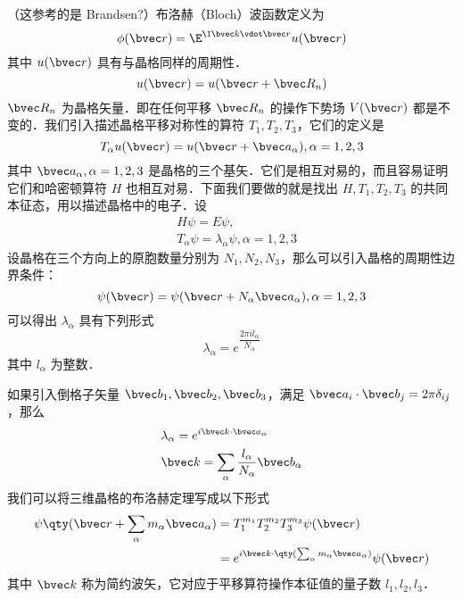 （这参考的是 Brandsen?）布洛赫（Bloch）波函数定义为
\begin{equation}
\phi(\bvec r) = \E^{\I \bvec k \vdot \bvec r} u(\bvec r)
\end{equation}
其中 $u(\bvec r)$ 具有与晶格同样的周期性．
\begin{equation}
u(\bvec r)=u(\bvec r+\bvec R_n)
\end{equation}
$\bvec R_n$ 为晶格矢量．即在任何平移 $\bvec R_n$ 的操作下势场 $V(\bvec r)$ 都是不变的．我们引入描述晶格平移对称性的算符 $T_1,T_2,T_3$，它们的定义是
\begin{equation}
T_\alpha u(\bvec r)= u(\bvec r+\bvec a_\alpha),\alpha=1,2,3
\end{equation}
其中 $\bvec a_\alpha,\alpha=1,2,3$ 是晶格的三个基矢．它们是相互对易的，而且容易证明它们和哈密顿算符 $H$ 也相互对易．下面我们要做的就是找出 $H,T_1,T_2,T_3$ 的共同本征态，用以描述晶格中的电子．设
\begin{equation}
\begin{aligned}
&H\psi=E\psi,\\
&T_\alpha \psi = \lambda_\alpha \psi, \alpha=1,2,3
\end{aligned}
\end{equation}
设晶格在三个方向上的原胞数量分别为 $N_1,N_2,N_3$，那么可以引入晶格的周期性边界条件：
\begin{equation}
\psi(\bvec r)=\psi(\bvec r+N_\alpha \bvec a_\alpha),\alpha=1,2,3
\end{equation}
可以得出 $\lambda_\alpha$ 具有下列形式
\begin{equation}
\lambda_\alpha=e^{ \dfrac{2\pi i l_\alpha}{N_\alpha}}
\end{equation}
其中 $l_\alpha$ 为整数．

如果引入倒格子矢量 $\bvec b_1,\bvec b_2,\bvec b_3$，满足 $\bvec a_i \cdot \bvec b_j = 2\pi \delta_{ij}$，那么
\begin{equation}
\begin{aligned}
&\lambda_\alpha = e^{i \bvec k \cdot \bvec a_\alpha}\\
&\bvec k=\sum_\alpha\frac{l_\alpha}{N_\alpha} \bvec b_\alpha
\end{aligned}
\end{equation}
我们可以将三维晶格的布洛赫定理写成以下形式
\begin{equation}
\begin{aligned}
\psi\qty(\bvec r+\sum_\alpha m_\alpha\bvec a_\alpha) &= T_1^{m_1} T_2^{m_2} T_3^{m_3} \psi(\bvec r)\\
&=e^{i\bvec k\cdot \qty(\sum_\alpha m_\alpha\bvec a_\alpha)}\psi(\bvec r)
\end{aligned}
\end{equation}
其中 $\bvec k$ 称为简约波矢，它对应于平移算符操作本征值的量子数 $l_1,l_2,l_3$．
